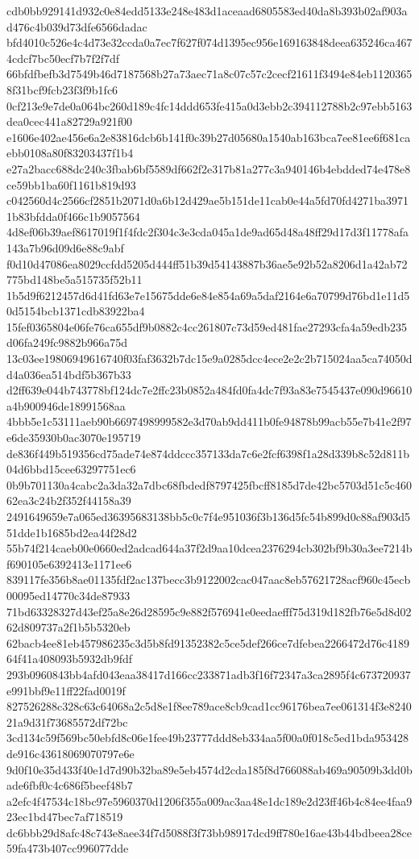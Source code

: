 {cdb0bb929141d932c0e84edd5133e248e483d1aceaad6805583ed40da8b393b02af903ad476c4b039d73dfe6566dadac
bfd4010c526e4c4d73e32ccda0a7ec7f627f074d1395ec956e169163848deea635246ca4674cdcf7bc50ecf7b7f2f7df
66bfdfbefb3d7549b46d7187568b27a73aec71a8c07c57c2cecf21611f3494e84eb11203658f31bcf9fcb23f3f9b1fc6
0cf213e9e7de0a064bc260d189c4fc14ddd653fe415a0d3ebb2c394112788b2c97ebb5163dea0cec441a82729a921f00
e1606e402ae456e6a2e83816dcb6b141f0c39b27d05680a1540ab163bca7ee81ee6f681caebb0108a80f83203437f1b4
e27a2bacc688dc240c3fbab6bf5589df662f2e317b81a277c3a940146b4ebdded74e478e8ce59bb1ba60f1161b819d93
c042560d4c2566cf2851b2071d0a6b12d429ae5b151de11cab0e44a5fd70fd4271ba39711b83bfdda0f466c1b9057564
4d8ef06b39aef8617019f1f4fdc2f304c3e3cda045a1de9ad65d48a48ff29d17d3f11778afa143a7b96d09d6e88c9abf
f0d10d47086ea8029ccfdd5205d444ff51b39d54143887b36ae5e92b52a8206d1a42ab72775bd148be5a515735f52b11
1b5d9f6212457d6d41fd63e7e15675dde6e84e854a69a5daf2164e6a70799d76bd1e11d50d5154bcb1371cdb83922ba4
15fef0365804e06fe76ca655df9b0882c4cc261807c73d59ed481fae27293cfa4a59edb235d06fa249fc9882b966a75d
13c03ee19806949616740f03faf3632b7dc15e9a0285dcc4ece2e2c2b715024aa5ca74050dd4a036ea514bdf5b367b33
d2ff639e044b743778bf124dc7e2ffc23b0852a484fd0fa4dc7f93a83e7545437e090d96610a4b900946de18991568aa
4bbb5e1c53111aeb90b6697498999582e3d70ab9dd411b0fe94878b99acb55e7b41e2f97e6de35930b0ac3070e195719
de836f449b519356cd75ade74e874ddccc357133da7c6e2fcf6398f1a28d339b8c52d811b04d6bbd15cee63297751ec6
0b9b701130a4cabc2a3da32a7dbc68fbdedf8797425fbcff8185d7de42bc5703d51c5c46062ea3c24b2f352f44158a39
2491649659e7a065ed36395683138bb5c0c7f4e951036f3b136d5fc54b899d0c88af903d551dde1b1685bd2ea44f28d2
55b74f214caeb00e0660ed2adcad644a37f2d9aa10dcea2376294cb302bf9b30a3ee7214bf690105e6392413e1171ee6
839117fe356b8ae01135fdf2ac137becc3b9122002cac047aac8eb57621728acf960c45ecb00095ed14770c34de87933
71bd63328327d43ef25a8e26d28595c9e882f576941e0eedaefff75d319d182fb76e5d8d0262d809737a2f1b5b5320eb
62bacb4ee81eb457986235c3d5b8fd91352382c5ce5def266ce7dfebea2266472d76c418964f41a408093b5932db9fdf
293b0960843bb4afd043eaa38417d166cc233871adb3f16f72347a3ca2895f4c673720937e991bbf9e11ff22fad0019f
827526288c328c63c64068a2c5d8e1f8ee789ace8cb9cad1cc96176bea7ee061314f3e824021a9d31f73685572df72bc
3cd134c59f569bc50ebfd8c06e1fee49b23777ddd8eb334aa5f00a0f018c5ed1bda953428de916c43618069070797e6e
9d0f10e35d433f40e1d7d90b32ba89e5eb4574d2cda185f8d766088ab469a90509b3dd0bade6fbf0c4c686f5beef48b7
a2efc4f47534c18bc97e5960370d1206f355a009ac3aa48e1dc189e2d23ff46b4c84ee4faa923ec1bd47bec7af718519
dc6bbb29d8afc48c743e8aee34f7d5088f3f73bb98917dcd9ff780e16ae43b44bdbeea28ce59fa473b407cc996077dde
}
